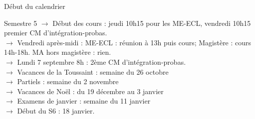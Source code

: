 \documentclass{beamer}
\begin{document}

\begin{frame}{Début du calendrier }
\begin{block}{Semestre 5}
$\to$  Début des cours :  jeudi 10h15 pour les ME-ECL, vendredi 10h15 premier CM d'intégration-probas. \\
$\to$  Vendredi après-midi : ME-ECL : réunion à 13h puis cours; Magistère : cours 14h-18h. MA hors magistère : rien.\\
$\to$ Lundi 7 septembre 8h : 2ème CM d'intégration-probas.\\
$\to$  Vacances de la Toussaint : semaine du  26 octobre \\
{\color{red}$\to$ Partiels :  semaine du 2 novembre}\\
$\to$  Vacances de Noël : du 19 décembre au 3 janvier \\
 {\color{red}$\to$ Examens de janvier : semaine du 11 janvier}\\
$\to$ Début du S6 : 18 janvier.\\
\end{block}
 \end{frame}
 
 
 
\end{document}
